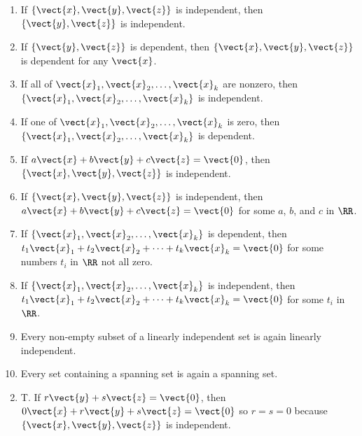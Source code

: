 \begin{multicols}{2}
\begin{ex}
\begin{enumerate}[label={\alph*.}]
\item If $\{\vect{x}, \vect{y}, \vect{z}\}$ is independent, then $\{\vect{y}, \vect{z}\}$ is independent.

\item If $\{\vect{y}, \vect{z}\}$ is dependent, then $\{\vect{x}, \vect{y}, \vect{z}\}$ is dependent for any $\vect{x}$.

\item If all of $\vect{x}_{1}, \vect{x}_{2}, \dots, \vect{x}_{k}$ are nonzero, then $\{\vect{x}_{1}, \vect{x}_{2}, \dots, \vect{x}_{k}\}$ is independent.

\item If one of $\vect{x}_{1}, \vect{x}_{2}, \dots, \vect{x}_{k}$ is zero, then $\{\vect{x}_{1}, \vect{x}_{2}, \dots, \vect{x}_{k}\}$ is dependent.

\item If $a\vect{x} + b\vect{y} + c\vect{z} = \vect{0}$, then $\{\vect{x}, \vect{y}, \vect{z}\}$ is independent.

\item If $\{\vect{x}, \vect{y}, \vect{z}\}$ is independent, then $a\vect{x} + b\vect{y} + c\vect{z} = \vect{0}$ for some $a$, $b$, and $c$ in $\RR$.

\item If $\{\vect{x}_{1}, \vect{x}_{2}, \dots, \vect{x}_{k}\}$ is dependent, then $t_{1}\vect{x}_{1} + t_{2}\vect{x}_{2} + \dots + t_{k}\vect{x}_{k} = \vect{0}$ for some numbers $t_{i}$ in $\RR$ not all zero.

\item If $\{\vect{x}_{1}, \vect{x}_{2}, \dots, \vect{x}_{k}\}$ is independent, then $t_{1}\vect{x}_{1} + t_{2}\vect{x}_{2} + \dots + t_{k}\vect{x}_{k} = \vect{0}$ for some $t_{i}$ in $\RR$.

\item Every non-empty subset of a linearly independent set is again linearly independent. 

\item Every set containing a spanning set is again a spanning set. 

\end{enumerate}
\begin{sol}
\begin{enumerate}[label={\alph*.}]
\setcounter{enumi}{1}
\item  T. If $r\vect{y} + s\vect{z} = \vect{0}$, then $0\vect{x} + r\vect{y} + s\vect{z} = \vect{0}$ so $r = s = 0$ because $\{\vect{x}, \vect{y}, \vect{z}\}$ is independent.


\end{enumerate}
\end{sol}
\end{ex}
\end{multicols}
